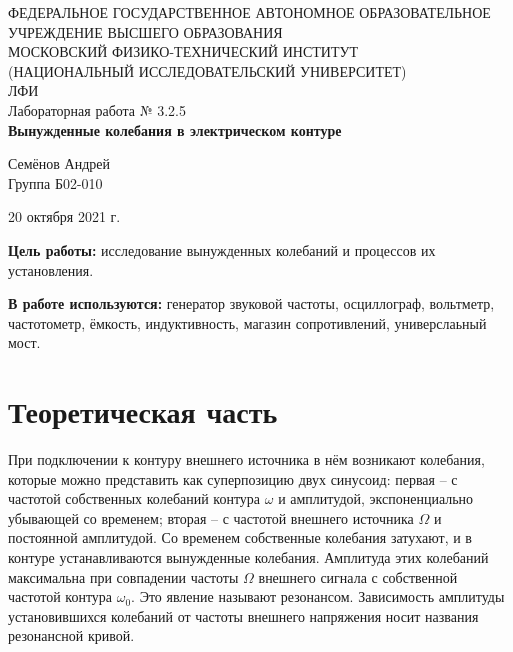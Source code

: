 \documentclass[a4paper,12pt]{article} %
\begin{document}
	\begin{center}
		\footnotesize{ФЕДЕРАЛЬНОЕ ГОСУДАРСТВЕННОЕ АВТОНОМНОЕ ОБРАЗОВАТЕЛЬНОЕ 			УЧРЕЖДЕНИЕ ВЫСШЕГО ОБРАЗОВАНИЯ}\\
		\footnotesize{МОСКОВСКИЙ ФИЗИКО-ТЕХНИЧЕСКИЙ ИНСТИТУТ\\(НАЦИОНАЛЬНЫЙ 			ИССЛЕДОВАТЕЛЬСКИЙ УНИВЕРСИТЕТ)}\\
		\footnotesize{ЛФИ\\}
		\hfill \break
		\hfill\break
		\hfill\break
		\hfill \break
		\hfill \break
		\hfill \break
		\hfill \break
		\hfill \break
		\hfill \break
		\hfill \break
		\hfill \break
		\hfill \break
		\hfill \break
		\hfill \break
		\large{Лабораторная работа № 3.2.5\\\textbf{Вынужденные колебания в электрическом контуре}}\\
		\hfill \break
		\hfill \break
		\hfill \break
		\begin{flushright}
			Семёнов Андрей\\
			Группа Б02-010
		\end{flushright}
		\hfill \break
		\hfill \break
		\hfill \break
		\hfill \break
		\hfill \break
	\end{center}
	\hfill \break
	\hfill \break
	\hfill \break
	\hfill \break
	\hfill \break
	\hfill \break
	\begin{center}
		20 октября 2021 г.
	\end{center}
	\thispagestyle{empty}
	\newpage
	
	\textbf{Цель работы:} исследование вынужденных колебаний и процессов их установления.
	
	\textbf{В работе используются:} генератор звуковой частоты, осциллограф, вольтметр, частотометр, ёмкость, индуктивность, магазин сопротивлений, универслаьный мост.
	
	
\section{Теоретическая часть}
	При подключении к контуру внешнего источника в нём возникают колебания, которые можно представить как суперпозицию двух синусоид: первая -- с частотой собственных колебаний контура $\omega$ и амплитудой, экспоненциально убывающей со временем; вторая -- с частотой внешнего источника $\Omega$ и постоянной амплитудой. Со временем собственные колебания затухают, и в контуре устанавливаются вынужденные колебания. Амплитуда этих колебаний максимальна при совпадении частоты $\Omega$ внешнего сигнала с собственной частотой контура $\omega_0$. Это явление называют резонансом. Зависимость амплитуды установившихся колебаний от частоты внешнего напряжения носит названия резонансной кривой.	
\end{document}
